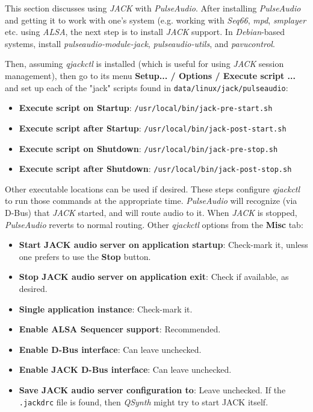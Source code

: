    This section discusses using \textsl{JACK} with \textsl{PulseAudio}.
   After installing \textsl{PulseAudio} and getting it to work with one's
   system (e.g. working with \textsl{Seq66}, \textsl{mpd},
   \textsl{smplayer} etc. using \textsl{ALSA},
   the next step is to install \textsl{JACK} support.
   In \textsl{Debian}-based systems, install \textsl{pulseaudio-module-jack},
   \textsl{pulseaudio-utils}, and \textsl{pavucontrol}.

   Then, assuming \textsl{qjackctl} is installed (which is useful for using
   \textsl{JACK} session management), then go to its menu
   \textbf{Setup... / Options / Execute script ...} and set up each of the
   "jack" scripts found in \texttt{data/linux/jack/pulseaudio}:

   \begin{itemize}
      \item \textbf{Execute script on Startup}:
         \texttt{/usr/local/bin/jack-pre-start.sh}
      \item \textbf{Execute script after Startup}:
         \texttt{/usr/local/bin/jack-post-start.sh}
      \item \textbf{Execute script on Shutdown}:
         \texttt{/usr/local/bin/jack-pre-stop.sh}
      \item \textbf{Execute script after Shutdown}:
         \texttt{/usr/local/bin/jack-post-stop.sh}
   \end{itemize}

   Other executable locations can be used if desired.
   These steps configure \textsl{qjackctl} to run those commands at
   the appropriate time.
   \textsl{PulseAudio} will recognize (via D-Bus) that \textsl{JACK} started,
   and will route audio to it. When \textsl{JACK} is stopped,
   \textsl{PulseAudio} reverts to normal routing.
   Other \textsl{qjackctl} options from the \textbf{Misc} tab:

   \begin{itemize}
      \item \textbf{Start JACK audio server on application startup}:
         Check-mark it, unless one prefers to use the \textbf{Stop} button.
      \item \textbf{Stop JACK audio server on application exit}:
         Check if available, as desired.
      \item \textbf{Single application instance}:
         Check-mark it.
      \item \textbf{Enable ALSA Sequencer support}:
         Recommended.
      \item \textbf{Enable D-Bus interface}:
         Can leave unchecked.
      \item \textbf{Enable JACK D-Bus interface}:
         Can leave unchecked.
      \item \textbf{Save JACK audio server configuration to}:
         Leave unchecked.  If the \texttt{.jackdrc} file is found, then
         \textsl{QSynth} might try to start JACK itself.
   \end{itemize}

